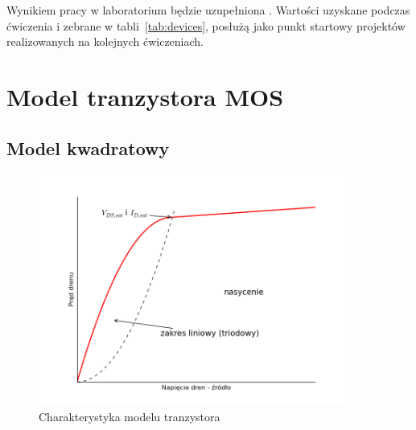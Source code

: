 \documentclass[twoside,pl,final]{labman}
\begin{document}
Wynikiem pracy w laboratorium będzie uzupełniona .
Wartości uzyskane podczas ćwiczenia i zebrane w tabli~\ref{tab:devices},
posłużą jako punkt startowy projektów realizowanych na kolejnych ćwiczeniach.

\FloatBarrier
\chapter{Model tranzystora MOS}
\label{model}

\section{Model kwadratowy}
\label{model:squarelaw}

\begin{figure}[!htbp]
  \centering
  \includegraphics[width=0.9\textwidth]{iv_squarelaw}
  \caption{Charakterystyka modelu tranzystora}
  \label{fig:squarelaw:iv}
\end{figure}
\end{document}
